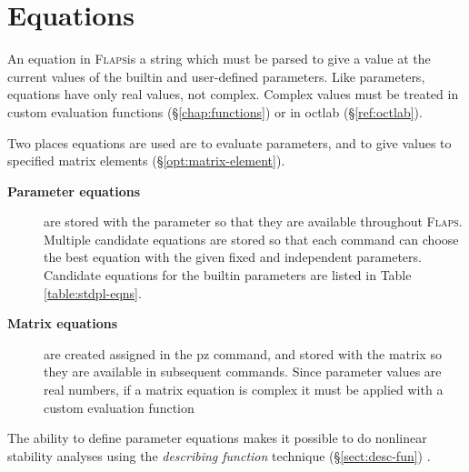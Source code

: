 \documentclass[11pt,openany,twoside]{book}
\numberwithin{equation}{section}		%
\newcommand{\Cmd}[1]{{\sf #1}}
\newcommand{\Newterm}[1]{{\em #1}}	%
\newcommand{\Flaps}{\textsc{Flaps\:}}
\newcommand{\Sectref}[1]{\S\ref{#1}}
\newcommand{\Tableref}[1]{Table \ref{#1}}
\begin{document}
\chapter{Equations}\label{chap:equations}
An equation in \Flaps is a string which must be parsed to
give a value at the current values of the builtin and user-defined
parameters. Like parameters, equations have only real values, not
complex. Complex values must be treated in custom evaluation functions
(\Sectref{chap:functions}) or in \Cmd{octlab}
(\Sectref{ref:octlab}).

Two places equations are used are to evaluate parameters,
and to give values to specified matrix elements (\Sectref{opt:matrix-element}).

\begin{description}
\item[{\bf Parameter equations}] are stored with the parameter
so that they are available throughout \Flaps. Multiple candidate
equations are stored so that each command can choose the best
equation with the given fixed and independent parameters.
Candidate equations for the builtin parameters are
listed in \Tableref{table:stdpl-eqns}.
\item[{\bf Matrix equations}] are created assigned in the \Cmd{pz} command,
and stored with the matrix so they are available in subsequent commands.
Since parameter values are real numbers, if a matrix equation is
complex it must be applied with a custom evaluation function
\end{description}


The ability to define parameter equations makes it possible
to do nonlinear stability analyses using the \Newterm{describing function}
technique (\Sectref{sect:desc-fun})\cite{krylov1947introduction}
\cite{gelb1968multiple}.
\end{document}
